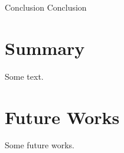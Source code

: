 \begin{chaptercover}{Conclusion}
  {Conclusion}

\section{Summary}
Some text.

\section{Future Works} \label{sec:future-works}
Some future works.

\end{chaptercover}
